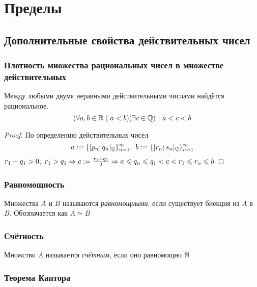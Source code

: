 \section{Пределы}

\subsection{Дополнительные свойства действительных чисел}

\subsubsection*{Плотность множества рациональных чисел в множестве действительных}

\begin{proposition}
    Между любыми двумя неравными действительными числами найдётся рациональное.
    \[
    	(\forall a, b \in \mathbb{R}\ |\ a < b)(\exists c \in \mathbb{Q})\ |\ a < c < b
    \]
\end{proposition}

\begin{proof}
    По определению действительных чисел
    $$
    a := \{[p_n; q_n]_{\mathbb{Q}}\}_{n = 1}^\infty,\ b := \{[r_n; s_n]_{\mathbb{Q}}\}_{n = 1}^\infty
    $$
    $r_1 - q_1 > 0;\ r_1 > q_1 \Rightarrow c:= \frac{r_1 + q_1}{2} \Rightarrow a \leqslant
    q_n \leqslant q_1 < c < r_1 \leqslant r_n \leqslant b$
\end{proof}

\subsubsection*{Равномощность}

\begin{definition}
    Множества $A$ и $B$ называются \textit{равномощными},
    если существует биекция из $A$ в $B$. Обозначается как
    $A \simeq B$
\end{definition}

\subsubsection*{Счётность}

\begin{definition}
    Множство $A$ называется \textit{счётным}, если оно равномощно $\mathbb{N}$
\end{definition}

\subsubsection*{Теорема Кантора}


